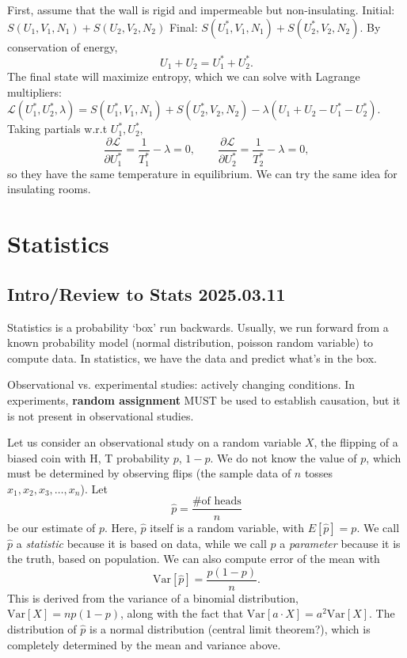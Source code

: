 \documentclass[12pt]{article}
\theoremstyle{remark}
\begin{document}
First, assume that the wall is rigid and impermeable but non-insulating.
Initial: $S(U_1,V_1,N_1)+S(U_2,V_2,N_2)$
Final: $S(U^\ast_1,V_1,N_1)+S(U^\ast_2,V_2,N_2).$
By conservation of energy,
\[U_1+U_2=U^\ast_1+U^\ast_2.\] The final state will maximize entropy, which we can solve with Lagrange multipliers:
$\mathcal{L}(U^\ast_1,U^\ast_2,\lambda)=S(U^\ast_1,V_1,N_1)+S(U^\ast_2,V_2,N_2)-\lambda(U_1+U_2-U^\ast_1-U^\ast_2).$
Taking partials w.r.t $U^\ast_1,U^\ast_2,$
\[\frac{\partial\mathcal{L}}{\partial U^\ast_1}=\frac{1}{T^\ast_1}-\lambda=0,\qquad\frac{\partial \mathcal{L}}{\partial U^\ast_2}=\frac{1}{T^\ast_2}-\lambda =0,\] so they have the same temperature in equilibrium. We can try the same idea for insulating rooms.

\section{Statistics}
\subsection{Intro/Review to Stats 2025.03.11}
Statistics is a probability `box' run backwards. Usually, we run forward from a known probability model (normal distribution, poisson random variable) to compute data. In statistics, we have the data and predict what's in the box.

Observational vs. experimental studies: actively changing conditions. In experiments, \textbf{random assignment} MUST be used to establish causation, but it is not present in observational studies. 

Let us consider an observational study on a random variable $X$, the flipping of a biased coin with H, T probability $p$, $1-p$. We do not know the value of $p$, which must be determined by observing flips (the sample data of $n$ tosses $x_1,x_2,x_3,\dots,x_n$). Let \[\hat p = \frac{\text{\# of heads}}{n}\] be our estimate of $p$. Here, $\hat p$ itself is a random variable, with $E[\hat p] = p$. We call $\hat p$ a \emph{statistic} because it is based on data, while we call $p$ a \emph{parameter} because it is the truth, based on population. We can also compute error of the mean with
\[\text{Var}[\hat p] = \frac{p(1-p)}{n}.\]
This is derived from the variance of a binomial distribution, $\text{Var}[X] = n p (1-p)$, along with the fact that $\text{Var}[a\cdot X] = a^2 \text{Var}[X]$. The distribution of $\hat p$ is a normal distribution (central limit theorem?), which is completely determined by the mean and variance above.
\end{document}
